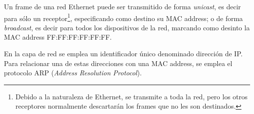 \par Un frame de una red Ethernet puede ser transmitido de forma \textit{unicast}, es decir para sólo un receptor\footnote{Debido a la naturaleza de Ethernet, se transmite a toda la red, pero los otros receptores normalmente descartarán los frames que no les son destinados.}, especificando como destino su MAC address; o de forma \textit{broadcast}, es decir para todos los dispositivos de la red, marcando como desinto la MAC address FF:FF:FF:FF:FF:FF.

\par En la capa de red se emplea un identificador único denominado dirección de IP.
Para relacionar una de estas direcciones con una MAC address, se emplea el protocolo ARP (\textit{Address Resolution Protocol}).
